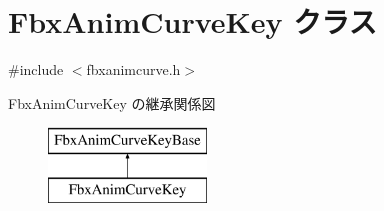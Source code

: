 \hypertarget{class_fbx_anim_curve_key}{}\section{Fbx\+Anim\+Curve\+Key クラス}
\label{class_fbx_anim_curve_key}


{\ttfamily \#include $<$fbxanimcurve.\+h$>$}

Fbx\+Anim\+Curve\+Key の継承関係図\begin{figure}[H]
\begin{center}
\leavevmode
\includegraphics[height=2.000000cm]{class_fbx_anim_curve_key}
\end{center}
\end{figure}
